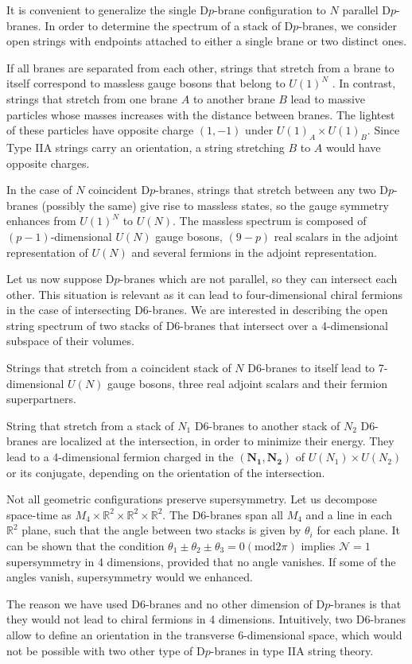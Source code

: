 It is convenient to generalize the single D$p$-brane configuration to $N$ parallel D$p$-branes.
In order to determine the spectrum of a stack of D$p$-branes, we consider open strings with endpoints 
attached to either a single brane or two distinct ones.

If all branes are separated from each other, strings that stretch from a brane to itself correspond to massless gauge bosons that belong to $U(1)^N$ .
In contrast, strings that stretch from one brane $A$ to another brane $B$ lead to massive particles whose
masses increases with the distance between branes.
The lightest of these particles have opposite charge $(1,-1)$ under $U(1)_A \times U(1)_B$.
Since Type IIA strings carry an orientation, a string stretching $B$ to $A$ would have opposite charges.

In the case of $N$ coincident D$p$-branes, strings that stretch between any two D$p$-branes (possibly the same)
give rise to massless states, so the gauge symmetry enhances from $U(1)^N$ to $U(N)$.
The massless spectrum is composed of $(p-1)$-dimensional $U(N)$ gauge bosons, $(9-p)$ real
scalars in the adjoint representation of $U(N)$ and several fermions in the adjoint representation.


Let us now suppose D$p$-branes which are not parallel, so they can intersect each other.
This situation is relevant as it can lead to four-dimensional chiral fermions in the case of intersecting D6-branes.
We are interested in describing the open string spectrum of two stacks of D$6$-branes that intersect over a 4-dimensional subspace of their volumes.

Strings that stretch from a coincident stack of $N$ D6-branes to itself lead to 7-dimensional $U(N)$ gauge bosons, three real adjoint scalars and their fermion superpartners.

String that stretch from a stack of $N_1$ D6-branes to another stack of $N_2$ D6-branes are localized at the intersection,
in order to minimize their energy. 
They lead to a 4-dimensional fermion charged in the $(\mathbf{N_1},\mathbf{N_2})$ of $U(N_1)\times U(N_2)$ or its conjugate, depending on the orientation
of the intersection.

Not all geometric configurations preserve supersymmetry. 
Let us decompose space-time as $M_4 \times \mathbb R^2 \times \mathbb R^2 \times \mathbb R^2 $.
The D6-branes span all $M_4$ and a line in each $\mathbb R^2$ plane, such that the angle between
two stacks is given by $\theta_i$ for each plane.
It can be shown that the condition $\theta_1\pm\theta_2\pm\theta_3=0 (\mathrm{mod} 2\pi)$ implies $\mathcal N=1$ 
supersymmetry in 4 dimensions, provided that no angle vanishes.
If some of the angles vanish, supersymmetry would we enhanced.

The reason we have used D6-branes and no other dimension of D$p$-branes is that they would not lead to chiral fermions in 4 dimensions.
Intuitively, two D6-branes allow to define an orientation in the transverse 6-dimensional space, which would not be possible
with two other type of D$p$-branes in type IIA string theory.
